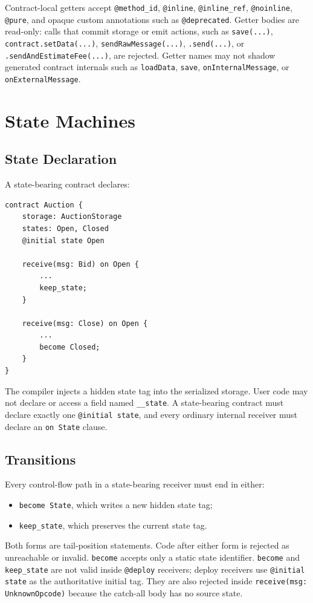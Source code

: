\documentclass[12pt,oneside]{article}
\begin{document}
Contract-local getters accept \verb|@method_id|, \verb|@inline|,
\verb|@inline_ref|, \verb|@noinline|, \verb|@pure|, and opaque custom
annotations such as \verb|@deprecated|. Getter bodies are read-only: calls that
commit storage or emit actions, such as \verb|save(...)|,
\verb|contract.setData(...)|, \verb|sendRawMessage(...)|, \verb|.send(...)|,
or \verb|.sendAndEstimateFee(...)|, are rejected. Getter names may not shadow
generated contract internals such as \verb|loadData|, \verb|save|,
\verb|onInternalMessage|, or \verb|onExternalMessage|.

\section{State Machines}
\label{sec:state-machines}
\subsection{State Declaration}
A state-bearing contract declares:

\begin{verbatim}
contract Auction {
    storage: AuctionStorage
    states: Open, Closed
    @initial state Open

    receive(msg: Bid) on Open {
        ...
        keep_state;
    }

    receive(msg: Close) on Open {
        ...
        become Closed;
    }
}
\end{verbatim}

The compiler injects a hidden state tag into the serialized storage. User code
may not declare or access a field named \verb|__state|. A state-bearing
contract must declare exactly one \verb|@initial state|, and every ordinary
internal receiver must declare an \verb|on State| clause.

\subsection{Transitions}
Every control-flow path in a state-bearing receiver must end in either:

\begin{itemize}
\item \verb|become State|, which writes a new hidden state tag;
\item \verb|keep_state|, which preserves the current state tag.
\end{itemize}

Both forms are tail-position statements. Code after either form is rejected as
unreachable or invalid. \verb|become| accepts only a static state identifier.
\verb|become| and \verb|keep_state| are not valid inside \verb|@deploy|
receivers; deploy receivers use \verb|@initial state| as the authoritative
initial tag. They are also rejected inside \verb|receive(msg: UnknownOpcode)|
because the catch-all body has no source state.
\end{document}
